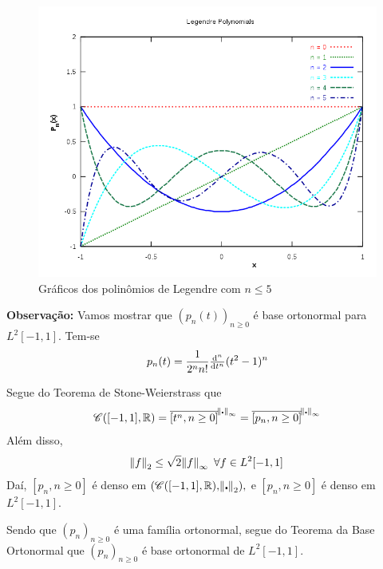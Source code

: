 \documentclass[11pt,a4paper]{article}
\begin{document}
{ \begin{figure}
     \includegraphics[scale=0.6]{figuras/legendre.png}
     \caption{Gráficos dos polinômios de Legendre com $n \le 5$}
 \end{figure}



 \textbf{Observação:} Vamos mostrar que $(p_n(t))_{n \ge 0}$ é base ortonormal para $L^2[-1,1].$ Tem-se
 \[
 p_n(t) = \frac{1}{2^n n!} \od[n]{}{t} (t^2 - 1)^n
 \]
 
 Segue do Teorema de Stone-Weierstrass que
 \[
 \mathcal{C}([-1,1], \mathbb{R}) = \overline{[t^n, n \ge 0 ]}^{\norm{\centerdot}_\infty} = \overline{[p_n , n \ge 0]}^{\norm{\centerdot}_\infty}
 \]
 Além disso,
 \[
 \norm{f}_2 \le \sqrt{2} \norm{f}_\infty \ \forall f \in L^2[-1,1] 
 \]
 Daí, $[p_n, n \ge 0]$ é denso em $(\mathcal{C}([-1,1], \mathbb{R}), \norm{\centerdot}_2),$ e $[p_n, n \ge 0]$ é denso em $L^2[-1,1].$
 
 Sendo que $(p_n)_{n \ge 0}$ é uma família ortonormal, segue do Teorema da Base Ortonormal que $(p_n)_{n \ge 0}$ é base ortonormal de $L^2[-1,1].$

}
\end{document}
